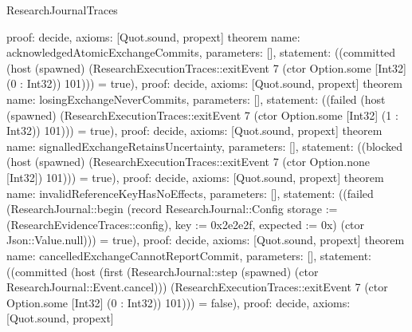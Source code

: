 \begin{lexlean}{ResearchJournalTraces}
\begin{semanticmodule}
{ proof: decide{},
 axioms: [Quot.sound, propext]
}
theorem{
 name: acknowledgedAtomicExchangeCommits,
 parameters: [],
 statement: ((committed (host (spawned) (ResearchExecutionTraces::exitEvent 7 (ctor Option.some [Int32] (0 : Int32)) 101))) = true),
 proof: decide{},
 axioms: [Quot.sound, propext]
}
theorem{
 name: losingExchangeNeverCommits,
 parameters: [],
 statement: ((failed (host (spawned) (ResearchExecutionTraces::exitEvent 7 (ctor Option.some [Int32] (1 : Int32)) 101))) = true),
 proof: decide{},
 axioms: [Quot.sound, propext]
}
theorem{
 name: signalledExchangeRetainsUncertainty,
 parameters: [],
 statement: ((blocked (host (spawned) (ResearchExecutionTraces::exitEvent 7 (ctor Option.none [Int32]) 101))) = true),
 proof: decide{},
 axioms: [Quot.sound, propext]
}
theorem{
 name: invalidReferenceKeyHasNoEffects,
 parameters: [],
 statement: ((failed (ResearchJournal::begin (record ResearchJournal::Config {storage := (ResearchEvidenceTraces::config), key := 0x2e2e2f, expected := 0x}) (ctor Json::Value.null))) = true),
 proof: decide{},
 axioms: [Quot.sound, propext]
}
theorem{
 name: cancelledExchangeCannotReportCommit,
 parameters: [],
 statement: ((committed (host (first (ResearchJournal::step (spawned) (ctor ResearchJournal::Event.cancel))) (ResearchExecutionTraces::exitEvent 7 (ctor Option.some [Int32] (0 : Int32)) 101))) = false),
 proof: decide{},
 axioms: [Quot.sound, propext]
}
\end{semanticmodule}
\end{lexlean}
